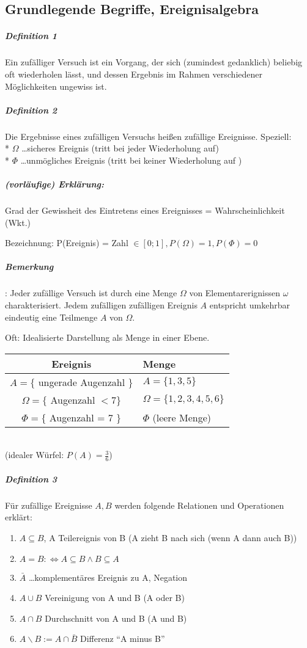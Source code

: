\documentclass[a4paper]{scrartcl}
\begin{document}
\subsection{Grundlegende Begriffe, Ereignisalgebra}
\subparagraph{Definition 1} Ein zufälliger Versuch ist ein Vorgang, der sich (zumindest gedanklich) beliebig oft wiederholen lässt, und dessen Ergebnis im Rahmen verschiedener Möglichkeiten ungewiss ist.
\subparagraph{Definition 2} Die Ergebnisse eines zufälligen Versuchs heißen zufällige Ereignisse. Speziell:\\*
$\Omega$ \dots sicheres Ereignis (tritt bei jeder Wiederholung auf)\\*
$\Phi$ \dots unmögliches Ereignis (tritt bei keiner Wiederholung auf )
\subparagraph{(vorläufige) Erklärung:} Grad der Gewissheit des Eintretens eines Ereignisses = Wahrscheinlichkeit (Wkt.)

Bezeichnung: P(Ereignis) = Zahl $\in [0;1], P(\Omega) = 1, P(\Phi) = 0$

\subparagraph{Bemerkung}: Jeder zufällige Versuch ist durch eine Menge $\Omega$ von Elementarerignissen $\omega$ charakterisiert. Jedem zufälligen zufälligen Ereignis $A$ entspricht umkehrbar eindeutig eine Teilmenge $A$ von $\Omega$.

Oft: Idealisierte Darstellung als Menge in einer Ebene.\\
\begin{tabular}{c|l}
Ereignis & Menge \\ \hline
$A=\{$ ungerade Augenzahl $\}$ & $A=\{1,3,5\}$\\
$\Omega = \{$ Augenzahl $<7\}$ & $\Omega =\{1,2,3,4,5,6\}$\\
$\Phi = \{$ Augenzahl = 7 $\}$ & $\Phi$ (leere Menge) \\
\end{tabular}\\
(idealer Würfel: $P(A)= \frac{3}{6}$)

\subparagraph{Definition 3} Für zufällige Ereignisse $A,B$ werden folgende Relationen und Operationen erklärt:
\begin{enumerate}
\item $A \subseteq B$, A Teilereignis von B (A zieht B nach sich (wenn A dann auch B))
\item $A=B : \Leftrightarrow A \subseteq B \wedge B \subseteq A$
\item $\bar{A}$ \dots komplementäres Ereignis zu A, Negation
\item $A \cup B$ Vereinigung von A und B (A oder B)
\item $A \cap B$ Durchschnitt von A und B (A und B)
\item $A \backslash B := A \cap \bar{B}$ Differenz "`A minus B"'
\end{enumerate}
\end{document}
